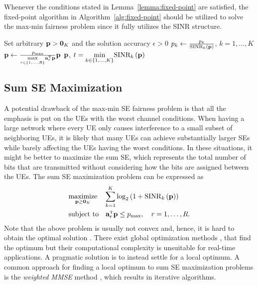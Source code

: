 Whenever the conditions stated in Lemma~\ref{lemma:fixed-point} are satisfied, the fixed-point algorithm in Algorithm~\ref{alg:fixed-point} should be utilized to solve the max-min fairness problem since it fully utilizes the SINR structure.


\begin{algorithm}
	\caption{Fixed-point algorithm for solving the max-min fairness problem in \eqref{eq:maxmin-fairness-problem-t}.} \label{alg:fixed-point}
	\begin{algorithmic}[1]
		 Set arbitrary $\mathbf{p}>\mathbf{0}_K$ and the solution accuracy $\epsilon>0$
		\State $p_k \gets \frac{p_k}{\textrm{SINR}_k\left(\mathbf{p}\right)}$, $k=1,\ldots,K$
		\State $\vect{p} \gets \frac{p_{\rm max}}{\underset{r\in\{1,\ldots,R\}}{\max}\vect{a}_r^{\Ttran}\vect{p}}\vect{p}$
		\EndWhile
		 $\mathbf{p}$, $t=\underset{k\in\{1,\ldots,K\}}{\min} \textrm{SINR}_k\left(\mathbf{p}\right)$
	\end{algorithmic}
\end{algorithm}


\subsection{Sum SE Maximization}

A potential drawback of the max-min SE fairness problem is that all the emphasis is put on the UEs with the worst channel conditions. When having a large network where every UE only causes interference to a small subset of neighboring UEs, it is likely that many UEs can achieve substantially larger SEs while barely affecting the UEs having the worst conditions. 
In these situations, it might be better to maximize the sum SE, which represents the total number of bits that are transmitted without considering how the bits are assigned between the UEs.
The sum SE maximization problem can be expressed as
 \begin{align}
 &\underset{\vect{p} \geq \vect{0}_K}{\textrm{maximize}} \quad \sum\limits_{k=1}^K  \log_2\left(1+\mathrm{SINR}_k\left(\vect{p}\right)\right) \nonumber\\
 &\textrm{subject to} \quad \vect{a}_r^{\Ttran}\vect{p}\leq p_{\textrm{max}}, \quad r=1,\ldots,R. \label{eq:sum-SE-maximization}
 \end{align}
Note that the above problem is usually not convex and, hence, it is hard to obtain the optimal solution \cite{Luo2008a}. There exist global optimization methods \cite{Bjornson2013d}, \cite{Weeraddana2012a} that find the optimum but their computational complexity is unsuitable for real-time applications. A pragmatic solution is to instead settle for a local optimum. A common approach for finding a local optimum to sum SE maximization problems is the \emph{weighted MMSE} method \cite{Shi2011}, which results in iterative algorithms.




